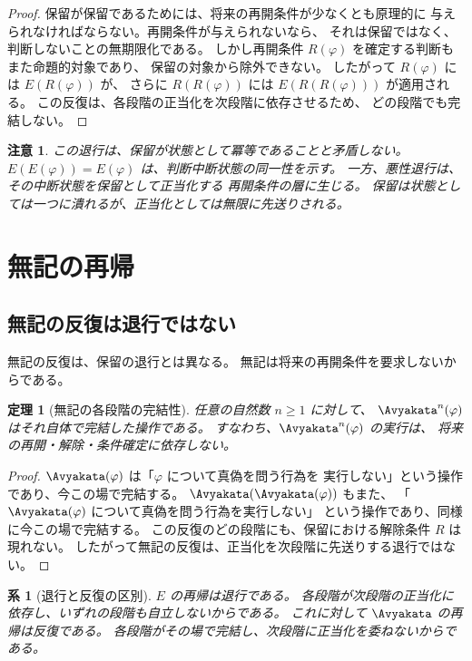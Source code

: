 \documentclass[11pt,a4paper,ja=standard,lualatex]{article}
\newtheorem{theorem}{定理}
\newtheorem{corollary}{系}
\newtheorem{remark}{注意}
\begin{document}
\begin{proof}
保留が保留であるためには、将来の再開条件が少なくとも原理的に
与えられなければならない。再開条件が与えられないなら、
それは保留ではなく、判断しないことの無期限化である。
しかし再開条件 $R(\varphi)$ を確定する判断もまた命題的対象であり、
保留の対象から除外できない。
したがって $R(\varphi)$ には $E(R(\varphi))$ が、
さらに $R(R(\varphi))$ には $E(R(R(\varphi)))$ が適用される。
この反復は、各段階の正当化を次段階に依存させるため、
どの段階でも完結しない。
\end{proof}

\begin{remark}
この退行は、保留が状態として冪等であることと矛盾しない。
$E(E(\varphi))=E(\varphi)$ は、判断中断状態の同一性を示す。
一方、悪性退行は、その中断状態を保留として正当化する
再開条件の層に生じる。
保留は状態としては一つに潰れるが、正当化としては無限に先送りされる。
\end{remark}

\section{無記の再帰}

\subsection{無記の反復は退行ではない}

無記の反復は、保留の退行とは異なる。
無記は将来の再開条件を要求しないからである。

\begin{theorem}[無記の各段階の完結性]
任意の自然数 $n\geq1$ に対して、
$\Avyakata^{n}(\varphi)$ はそれ自体で完結した操作である。
すなわち、$\Avyakata^{n}(\varphi)$ の実行は、
将来の再開・解除・条件確定に依存しない。
\end{theorem}

\begin{proof}
$\Avyakata(\varphi)$ は「$\varphi$ について真偽を問う行為を
実行しない」という操作であり、今この場で完結する。
$\Avyakata(\Avyakata(\varphi))$ もまた、
「$\Avyakata(\varphi)$ について真偽を問う行為を実行しない」
という操作であり、同様に今この場で完結する。
この反復のどの段階にも、保留における解除条件 $R$ は現れない。
したがって無記の反復は、正当化を次段階に先送りする退行ではない。
\end{proof}

\begin{corollary}[退行と反復の区別]
$E$ の再帰は退行である。
各段階が次段階の正当化に依存し、いずれの段階も自立しないからである。
これに対して $\Avyakata$ の再帰は反復である。
各段階がその場で完結し、次段階に正当化を委ねないからである。
\end{corollary}
\end{document}
